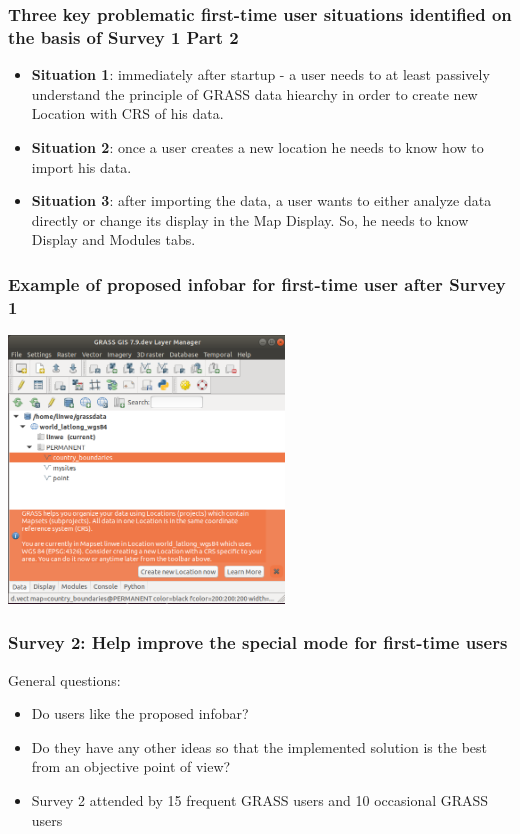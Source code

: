 \documentclass[aspectratio=169]{beamer}
\begin{document}
\begin{frame}
\frametitle{Three key problematic first-time user situations identified on the basis of Survey 1 Part 2}

\begin{itemize}
\item{\textbf{Situation 1}: immediately after startup - a user needs to at least passively understand the principle of GRASS data hiearchy in order to create new Location with CRS of his data.}
\vspace{0.5cm}
\item{\textbf{Situation 2}: once a user creates a new location he needs to know how to import his data.}
\vspace{0.5cm}
\item{\textbf{Situation 3}: after importing the data, a user wants to either analyze data directly or change its display in the Map Display. So, he needs to know Display and Modules tabs.}
\end{itemize}
\end{frame}

\begin{frame}
\frametitle{Example of proposed infobar for first-time user after Survey 1}
	\centering
        \includegraphics[width=0.55\textwidth]{pictures/info1before.PNG}
\end{frame}

\begin{frame}
\frametitle{Survey 2: Help improve the special mode for first-time users}
General questions:
\begin{itemize}
\item Do users like the proposed infobar?
\item Do they have any other ideas so that the implemented solution is the best from an objective point of view?
\vspace{0.4cm}
\item Survey 2 attended by 15 frequent GRASS users and 10 occasional GRASS users
\end{itemize}
\end{frame}
\end{document}
